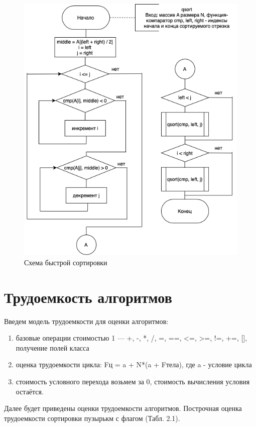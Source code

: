 \documentclass{report}
\begin{document}
\newpage
\begin{figure}[hp!]
	\centering
	\includegraphics[width=0.7\linewidth]{report_files/quick_sort.png}
	\caption{Схема быстрой сортировки}
	\label{fig:mpr3}
\end{figure}

\newpage
\section{Трудоемкость алгоритмов}
Введем модель трудоемкости для оценки алгоритмов:
\begin{enumerate}
  	\item  базовые операции стоимостью 1 — +, -, *, /, =, ==, <=, >=, !=, +=, [], получение полей класса
	\item оценка трудоемкости цикла: Fц = a + N*(a + Fтела), где a - условие цикла
	\item стоимость условного перехода возьмем за 0, стоимость вычисления условия остаётся.
\end{enumerate}

Далее будет приведены оценки трудоемкости алгоритмов. Построчная оценка трудоемкости сортировки пузырькм с флагом (Табл. 2.1).
\end{document}
